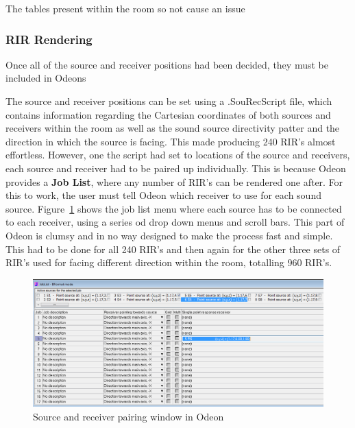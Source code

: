 \documentclass[../../main.tex]{subfiles}
\begin{document}
			The tables present within the room so not cause an issue 

		\subsubsection{RIR Rendering}

			Once all of the source and receiver positions had been decided, they must be included in Odeons 

			The source and receiver positions can be set using a .SouRecScript file, which contains information regarding the Cartesian coordinates of both sources and receivers within the room as well as the sound source directivity patter and the direction in which the source is facing. This made producing 240 \ac{RIR}'s almost effortless. However, one the script had set to locations of the source and receivers, each source and receiver had to be paired up individually. This is because Odeon provides a \textbf{Job List}, where any number of \ac{RIR}'s can be rendered one after. For this to work, the user must tell Odeon which receiver to use for each sound source. Figure~\ref{SouRecPos} shows the job list menu where each source has to be connected to each receiver, using a series od drop down menus and scroll bars. This part of Odeon is clumsy and in no way designed to make the process fast and simple. This had to be done for all 240 \ac{RIR}'s and then again for the other three sets of \ac{RIR}'s used for facing different direction within the room, totalling 960 \ac{RIR}'s.

			\begin{figure}[H]
				\centerline{\includegraphics[scale = 0.4]{Sections/Implementation/Odeon/images/SouRecPos/SouRecSelection_crop.png}}
				\caption{Source and receiver pairing window in Odeon}
				\label{SouRecPos}
			\end{figure}
\end{document}
